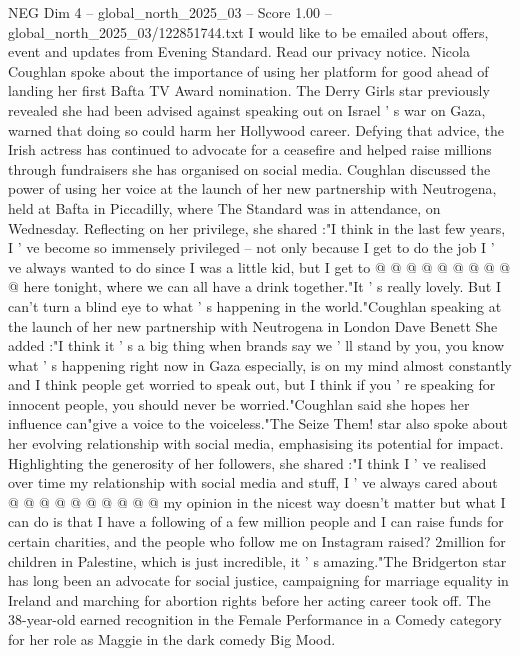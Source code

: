 \begin{textsample}{NEG Dim 4 – global\_north\_2025\_03 – Score 1.00 – global\_north\_2025\_03/122851744.txt}  \label{ex:f4_neg_397}
I would like to be emailed about offers, event and updates from Evening Standard.
Read our privacy notice.
Nicola Coughlan spoke about the importance of using her platform for good ahead of landing her first Bafta TV Award nomination.
The Derry Girls star previously revealed she had been advised against speaking out on Israel ' s war on Gaza, warned that doing so could harm her Hollywood career.
Defying that advice, the Irish actress has continued to advocate for a ceasefire and helped raise millions through fundraisers she has organised on social media.
Coughlan discussed the power of using her voice at the launch of her new partnership with Neutrogena, held at Bafta in Piccadilly, where The Standard was in attendance, on Wednesday.
Reflecting on her privilege, she shared :"I think in the last few years, I ' ve become so immensely privileged -- not only because I get to do the job I ' ve always wanted to do since I was a little kid, but I get to @ @ @ @ @ @ @ @ @ @ here tonight, where we can all have a drink together."It ' s really lovely.
But I can't turn a blind eye to what ' s happening in the world."Coughlan speaking at the launch of her new partnership with Neutrogena in London Dave Benett She added :"I think it ' s a big thing when brands say we ' ll stand by you, you know what ' s happening right now in Gaza especially, is on my mind almost constantly and I think people get worried to speak out, but I think if you ' re speaking for innocent people, you should never be worried."Coughlan said she hopes her influence can"give a voice to the voiceless."The Seize Them! star also spoke about her evolving relationship with social media, emphasising its potential for impact.
Highlighting the generosity of her followers, she shared :"I think I ' ve realised over time my relationship with social media and stuff, I ' ve always cared about @ @ @ @ @ @ @ @ @ @ my opinion in the nicest way doesn't matter but what I can do is that I have a following of a few million people and I can raise funds for certain charities, and the people who follow me on Instagram raised? 2million for children in Palestine, which is just incredible, it ' s amazing."The Bridgerton star has long been an advocate for social justice, campaigning for marriage equality in Ireland and marching for abortion rights before her acting career took off.
The 38-year-old earned recognition in the Female Performance in a Comedy category for her role as Maggie in the dark comedy Big Mood.

\end{textsample}
